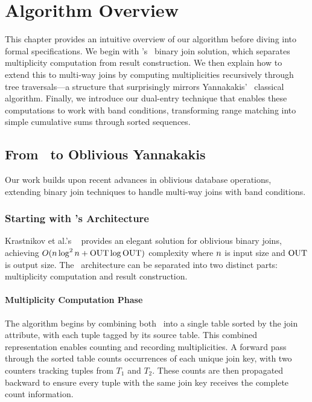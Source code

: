 \chapter{Algorithm Overview}

This chapter provides an intuitive overview of our algorithm before diving into formal specifications. We begin with \odbj's~\cite{krastnikov2020} binary join solution, which separates multiplicity computation from result construction. We then explain how to extend this to multi-way joins by computing multiplicities recursively through tree traversals---a structure that surprisingly mirrors Yannakakis'~\cite{yannakakis1981} classical algorithm. Finally, we introduce our dual-entry technique that enables these computations to work with band conditions, transforming range matching into simple cumulative sums through sorted sequences.

\section{From \odbj\ to Oblivious Yannakakis}

Our work builds upon recent advances in oblivious database operations, extending binary join techniques to handle multi-way joins with band conditions.

\subsection{Starting with \odbj's Architecture}

Krastnikov et al.'s \odbj~\cite{krastnikov2020} provides an elegant solution for oblivious binary joins, achieving $O(n \log^2 n + \text{OUT} \log \text{OUT})$ complexity where $n$ is input size and $\text{OUT}$ is output size. The \odbj\ architecture can be separated into two distinct parts: multiplicity computation and result construction.

\subsubsection{Multiplicity Computation Phase}

The algorithm begins by combining both \ into a single table sorted by the join attribute, with each tuple tagged by its source table. This combined representation enables counting and recording multiplicities. A forward pass through the sorted table counts occurrences of each unique join key, with two counters tracking tuples from $T_1$ and $T_2$. These counts are then propagated backward to ensure every tuple with the same join key receives the complete count information. 


